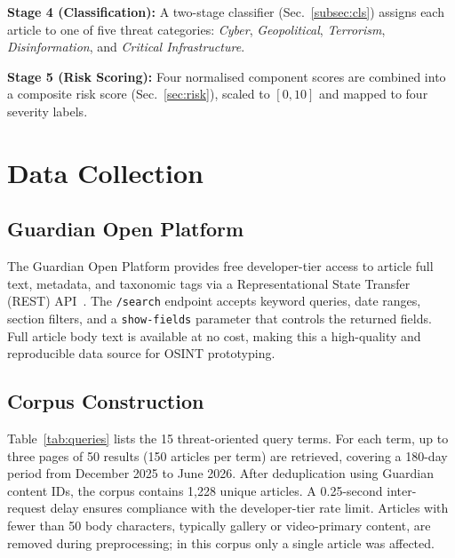 \documentclass[12pt,lettersize,journal,onecolumn]{IEEEtran}
\begin{document}
\textbf{Stage 4 (Classification):} A two-stage classifier (Sec.~\ref{subsec:cls}) assigns each article to one of five threat categories: \emph{Cyber}, \emph{Geopolitical}, \emph{Terrorism}, \emph{Disinformation}, and \emph{Critical Infrastructure}.

\textbf{Stage 5 (Risk Scoring):} Four normalised component scores are combined into a composite risk score (Sec.~\ref{sec:risk}), scaled to $[0,10]$ and mapped to four severity labels.

% 
\section{Data Collection}
\label{sec:data}
% 

\subsection{Guardian Open Platform}

The Guardian Open Platform provides free developer-tier access to article full text, metadata, and taxonomic tags via a Representational State Transfer (REST) API~\cite{guardianapi}. The \texttt{/search} endpoint accepts keyword queries, date ranges, section filters, and a \texttt{show-fields} parameter that controls the returned fields. Full article body text is available at no cost, making this a high-quality and reproducible data source for OSINT prototyping.

\subsection{Corpus Construction}

Table~\ref{tab:queries} lists the 15 threat-oriented query terms. For each term, up to three pages of 50 results (150 articles per term) are retrieved, covering a 180-day period from December 2025 to June 2026. After deduplication using Guardian content IDs, the corpus contains 1,228 unique articles. A 0.25-second inter-request delay ensures compliance with the developer-tier rate limit. Articles with fewer than 50 body characters, typically gallery or video-primary content, are removed during preprocessing; in this corpus only a single article was affected.
\end{document}
